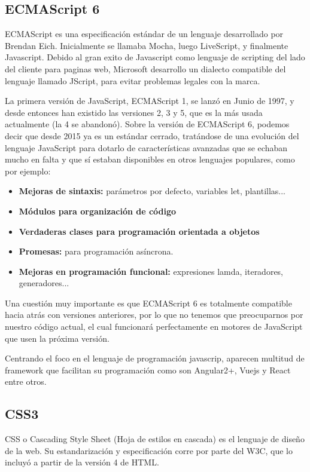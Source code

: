 \subsection*{ECMAScript 6}
ECMAScript es una especificación estándar de un lenguaje desarrollado por Brendan Eich. Inicialmente se llamaba Mocha, luego LiveScript, y finalmente Javascript. Debido al gran exito de Javascript como lenguaje de scripting del lado del cliente para paginas web, Microsoft desarrollo un dialecto compatible del lenguaje llamado JScript, para evitar problemas legales con la marca. 

La primera versión de JavaScript, ECMAScript 1, se lanzó en Junio de 1997, y desde entonces han existido las versiones 2, 3 y 5, que es la más usada actualmente (la 4 se abandonó). Sobre la versión de ECMAScript 6, podemos decir que desde 2015 ya es un estándar cerrado, tratándose de una evolución del lenguaje JavaScript para dotarlo de características avanzadas que se echaban mucho en falta y que sí estaban disponibles en otros lenguajes populares, como por ejemplo: 

\begin{itemize}
    \item \textbf{Mejoras de sintaxis: } parámetros por defecto, variables let, plantillas...
    \item \textbf{Módulos para organización de código}
    \item \textbf{Verdaderas clases para programación orientada a objetos } 
    \item \textbf{Promesas: } para programación asíncrona.
    \item \textbf{Mejoras en programación funcional: } expresiones lamda, iteradores, generadores...
\end{itemize}

Una cuestión muy importante es que ECMAScript 6 es totalmente compatible hacia atrás con versiones anteriores, por lo que no tenemos que preocuparnos por nuestro código actual, el cual funcionará perfectamente en motores de JavaScript que usen la próxima versión.

Centrando el foco en el lenguaje de programación javascrip, aparecen multitud de framework que facilitan su programación como son Angular2+, Vuejs y React entre otros. 

\subsection*{CSS3}
CSS o Cascading Style Sheet (Hoja de estilos en cascada) es el lenguaje de diseño de la web. Su estandarización y especificación corre por parte del W3C, que lo incluyó a partir de la versión 4 de HTML.

